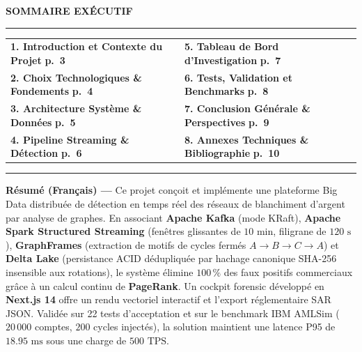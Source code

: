
\thispagestyle{plain}

\begin{center}
    {\normalsize\bfseries\color{primaryNavy} SOMMAIRE EXÉCUTIF}
\end{center}
\vspace{-0.15cm}
\noindent\rule{\textwidth}{0.8pt}
\vspace{0.15cm}

\footnotesize
\noindent
\begin{tabularx}{\textwidth}{p{} p{}}
\textbf{1. Introduction et Contexte du Projet} \dotfill \textbf{p.~3} & \textbf{5. Tableau de Bord d'Investigation} \dotfill \textbf{p.~7} \\
\textbf{2. Choix Technologiques \& Fondements} \dotfill \textbf{p.~4} & \textbf{6. Tests, Validation et Benchmarks} \dotfill \textbf{p.~8} \\
\textbf{3. Architecture Système \& Données} \dotfill \textbf{p.~5} & \textbf{7. Conclusion Générale \& Perspectives} \dotfill \textbf{p.~9} \\
\textbf{4. Pipeline Streaming \& Détection} \dotfill \textbf{p.~6} & \textbf{8. Annexes Techniques \& Bibliographie} \dotfill \textbf{p.~10} \\
\end{tabularx}

\vspace{0.25cm}
\noindent\rule{\textwidth}{0.8pt}
\vspace{0.2cm}

\noindent\textbf{\color{primaryNavy}Résumé (Français) ---} Ce projet conçoit et implémente une plateforme Big Data distribuée de détection en temps réel des réseaux de blanchiment d'argent par analyse de graphes. En associant \textbf{Apache Kafka} (mode KRaft), \textbf{Apache Spark Structured Streaming} (fenêtres glissantes de $10\text{ min}$, filigrane de $120\text{ s}$), \textbf{GraphFrames} (extraction de motifs de cycles fermés $A \to B \to C \to A$) et \textbf{Delta Lake} (persistance ACID dédupliquée par hachage canonique SHA-256 insensible aux rotations), le système élimine $100\,\%$ des faux positifs commerciaux grâce à un calcul continu de \textbf{PageRank}. Un cockpit forensic développé en \textbf{Next.js 14} offre un rendu vectoriel interactif et l'export réglementaire SAR JSON. Validée sur 22 tests d'acceptation et sur le benchmark IBM AMLSim ($20\,000$ comptes, $200$ cycles injectés), la solution maintient une latence P95 de $18.95\text{ ms}$ sous une charge de $500\text{ TPS}$.

